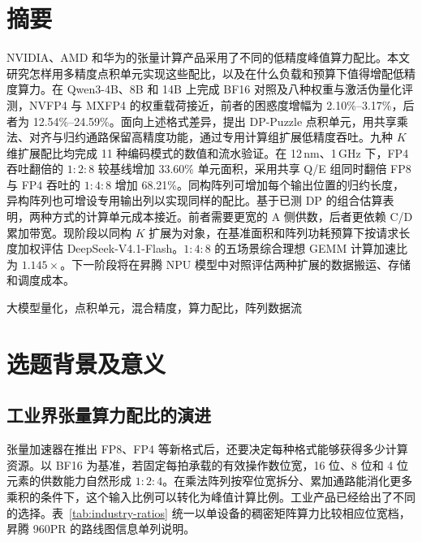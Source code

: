 \documentclass[10.5pt,compsoc,UTF8]{CjC}
\newcommand{\heiti}{\sffamily\bfseries}
\newcommand{\ratio}[3]{\ensuremath{#1\!:\!#2\!:\!#3}}
\begin{document}
\section*{摘\quad 要}
NVIDIA、AMD 和华为的张量计算产品采用了不同的低精度峰值算力配比。本文研究怎样用多精度点积单元实现这些配比，以及在什么负载和预算下值得增配低精度算力。在 Qwen3-4B、8B 和 14B 上完成 BF16 对照及八种权重与激活伪量化评测，NVFP4 与 MXFP4 的权重载荷接近，前者的困惑度增幅为 2.10\%--3.17\%，后者为 12.54\%--24.59\%。面向上述格式差异，提出 DP-Puzzle 点积单元，用共享乘法、对齐与归约通路保留高精度功能，通过专用计算组扩展低精度吞吐。九种 $K$ 维扩展配比均完成 11 种编码模式的数值和流水验证。在 12\,nm、1\,GHz 下，FP4 吞吐翻倍的 \ratio{1}{2}{8} 较基线增加 33.60\% 单元面积，采用共享 Q/E 组同时翻倍 FP8 与 FP4 吞吐的 \ratio{1}{4}{8} 增加 68.21\%。同构阵列可增加每个输出位置的归约长度，异构阵列也可增设专用输出列以实现同样的配比。基于已测 DP 的组合估算表明，两种方式的计算单元成本接近。前者需要更宽的 A 侧供数，后者更依赖 C/D 累加带宽。现阶段以同构 $K$ 扩展为对象，在基准面积和阵列功耗预算下按请求长度加权评估 DeepSeek-V4.1-Flash。\ratio{1}{4}{8} 的五场景综合理想 GEMM 计算加速比为 $1.145\times$。下一阶段将在昇腾 NPU 模型中对照评估两种扩展的数据搬运、存储和调度成本。

\smallskip
\noindent{\heiti 关键词}\quad 大模型量化，点积单元，混合精度，算力配比，阵列数据流

\section{选题背景及意义}

\subsection{工业界张量算力配比的演进}

张量加速器在推出 FP8、FP4 等新格式后，还要决定每种格式能够获得多少计算资源。以 BF16 为基准，若固定每拍承载的有效操作数位宽，16 位、8 位和 4 位元素的供数能力自然形成 \ratio{1}{2}{4}。在乘法阵列按窄位宽拆分、累加通路能消化更多乘积的条件下，这个输入比例可以转化为峰值计算比例。工业产品已经给出了不同的选择。表~\ref{tab:industry-ratios} 统一以单设备的稠密矩阵算力比较相应位宽档，昇腾 960PR 的路线图信息单列说明。
\end{document}
